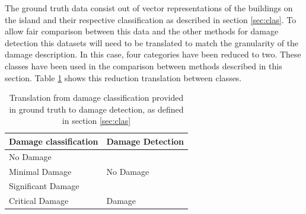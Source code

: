 \noindent The ground truth data consist out of vector representations of the buildings on the island and their respective classification as described in section \ref{sec:clas}. To allow fair comparison between this data and the other methods for damage detection this datasets will need to be translated to match the granularity of the damage description. In this case, four categories have been reduced to two. These classes have been used in the comparison between methods described in this section. Table \ref{tab:clastrans} shows this reduction translation between classes.\\

\begin{table} [H]
	\centering
	\footnotesize
	\captionsetup{justification=raggedright,singlelinecheck=false}
	\caption{\footnotesize{Translation from damage classification provided in ground truth to damage detection, as defined in section \ref{sec:clas}}}	
	\begin{tabular}{ll}
		\toprule
		Damage classification & Damage Detection \\
		\midrule			
		No Damage &\\
		Minimal Damage & No Damage\\
		\midrule	
		Significant Damage &\\
		Critical Damage & Damage\\
		\bottomrule
	\end{tabular}
	\label{tab:clastrans}
\end{table} 

